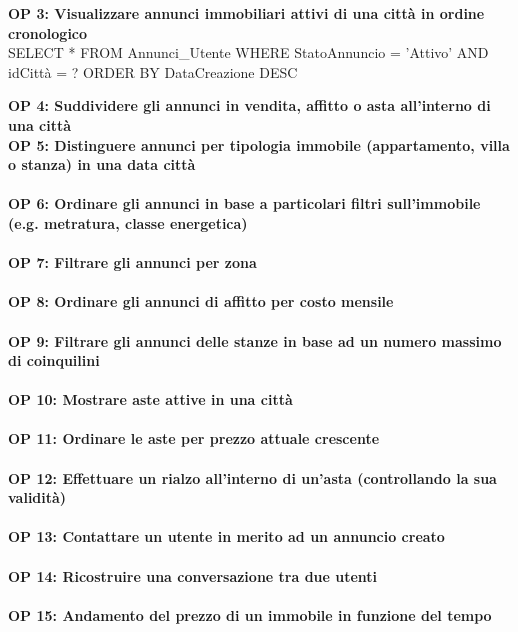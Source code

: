 \documentclass[a4paper,12pt]{report}
\begin{document}
            \textbf{OP 3: Visualizzare annunci immobiliari attivi di una città in ordine cronologico} \\
            SELECT *
            FROM Annunci\_Utente 
            WHERE StatoAnnuncio = 'Attivo' AND idCittà = ?
            ORDER BY DataCreazione DESC

            \textbf{OP 4: Suddividere gli annunci in vendita, affitto o asta all’interno di una città} \\
            
            
            \textbf{OP 5: Distinguere annunci per tipologia immobile (appartamento, villa o stanza) in una data città} \\
             \\
            \textbf{OP 6: Ordinare gli annunci in base a particolari filtri sull'immobile (e.g. metratura, classe energetica)} \\
             \\
            \textbf{OP 7: Filtrare gli annunci per zona} \\
             \\
            \textbf{OP 8: Ordinare gli annunci di affitto per costo mensile} \\
             \\
            \textbf{OP 9: Filtrare gli annunci delle stanze in base ad un numero massimo di coinquilini} \\
             \\
            \textbf{OP 10: Mostrare aste attive in una città} \\
             \\
            \textbf{OP 11: Ordinare le aste per prezzo attuale crescente} \\
             \\
            \textbf{OP 12: Effettuare un rialzo all’interno di un’asta (controllando la sua validità)} \\
             \\
            \textbf{OP 13: Contattare un utente in merito ad un annuncio creato} \\
             \\
            \textbf{OP 14: Ricostruire una conversazione tra due utenti} \\
             \\
            \textbf{OP 15: Andamento del prezzo di un immobile in funzione del tempo} \\
             \\
\end{document}
